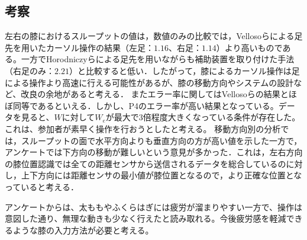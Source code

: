\documentclass[submit, techrep]{ipsj}
\begin{document}
\subsection{考察}
左右の膝におけるスループットの値は，数値のみの比較では，Vellosoら\cite{velloso:hal-01599657}による足先を用いたカーソル操作の結果（左足：$1.16$、右足：$1.14$）より高いものである。一方でHorodniczyら\cite{Horodniczy:2017:FHE:3025453.3025625}による足先を用いながらも補助装置を取り付けた手法（右足のみ：$2.21$）と比較すると低い．したがって，膝によるカーソル操作は足による操作より高速に行える可能性があるが、膝の移動方向やシステムの設計など、改良の余地があると考える．
またエラー率に関してはVellosoら\cite{velloso:hal-01599657}の結果とほぼ同等であるといえる．しかし、P4のエラー率が高い結果となっている。データを見ると、$W$に対して$W_e$が最大で3倍程度大きくなっている条件が存在した。これは、参加者が素早く操作を行おうとしたと考える。
移動方向別の分析では，スループットの面で水平方向よりも垂直方向の方が高い値を示した一方で，アンケートでは下方向の移動が難しいという意見が多かった．これは，左右方向の膝位置認識では全ての距離センサから送信されるデータを総合しているのに対し，上下方向には距離センサの最小値が膝位置となるので，より正確な位置となっていると考える．\par
アンケートからは、太ももやふくらはぎには疲労が溜まりやすい一方で、操作は意図した通り、無理な動きも少なく行えたと読み取れる。今後疲労感を軽減できるような膝の入力方法が必要と考える。

\end{document}
